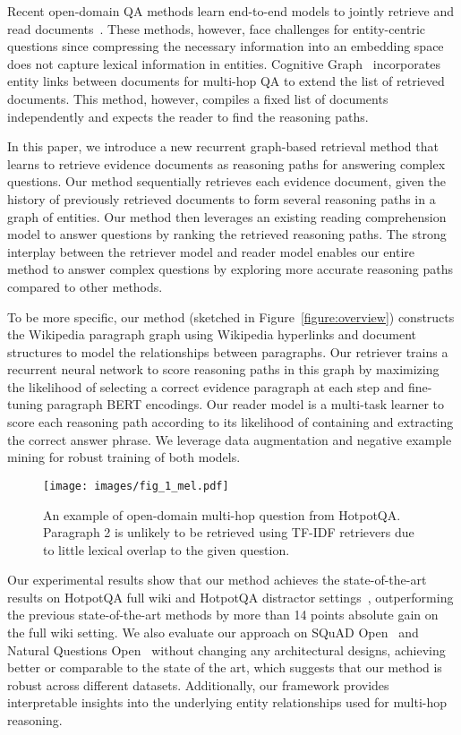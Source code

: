 \documentclass{article} \usepackage{iclr2020_conference,times}
\begin{document}
Recent open-domain QA methods learn end-to-end models to jointly retrieve and read documents~\citep{denspi,lee-chang-toutanova:2019:ACL2019}.
These methods, however, face challenges for entity-centric questions since compressing the necessary information into an embedding space does not capture lexical information in entities. 
Cognitive Graph~\citep{cognitive_graph_2019} incorporates entity links between documents for multi-hop QA  to extend the list of retrieved documents.
This method, however, compiles a fixed list of documents independently and expects the reader to find the reasoning paths. 

In this paper, we introduce a new recurrent graph-based retrieval method that learns to retrieve evidence documents as reasoning paths for answering complex questions.
Our method sequentially retrieves each evidence document, given the history of previously retrieved  documents to form several reasoning paths in a graph of entities.
Our method then leverages an existing reading comprehension model to answer questions by ranking the retrieved reasoning paths.
The strong interplay between the retriever model and reader model enables our entire method to answer complex questions by exploring more accurate reasoning paths compared to other methods. 

To be more specific, our method (sketched in Figure~\ref{figure:overview}) constructs the Wikipedia paragraph graph using Wikipedia hyperlinks and document structures to model the relationships between paragraphs.
Our retriever trains a recurrent neural network to  score reasoning paths in this graph by maximizing the likelihood of selecting a correct evidence paragraph at each step and fine-tuning paragraph BERT encodings.
Our reader model is a multi-task learner to score each reasoning path according to its likelihood of containing and extracting the correct answer phrase. We leverage data augmentation and negative example mining for robust training of both models. 

\begin{figure}[t]
  \centering
  \texttt{[image: images/fig\_1\_mel.pdf]}  \caption{An example of open-domain multi-hop question from HotpotQA. Paragraph 2 is unlikely to be retrieved using TF-IDF retrievers due to little lexical overlap to the given question. }
  \label{figure:examples_multi_hop_qa}
\end{figure}

Our experimental results show that our  method achieves the state-of-the-art results on HotpotQA full wiki and HotpotQA distractor settings~\citep{yang-etal-2018-hotpotqa}, outperforming the previous state-of-the-art methods by more than 14 points absolute  gain on the full wiki setting. 
We also evaluate our approach on SQuAD Open~\citep{chen2017reading} and Natural Questions Open~\citep{lee-chang-toutanova:2019:ACL2019} without changing any architectural designs, achieving better or comparable to the state of the art, which suggests that our method is robust across different datasets.
Additionally, our framework provides interpretable insights into the underlying entity relationships used for multi-hop reasoning. 
\end{document}

